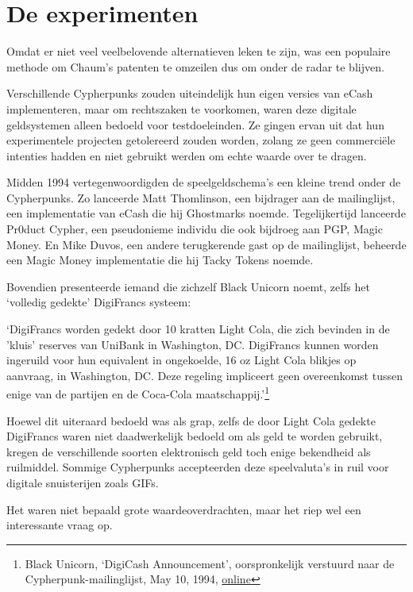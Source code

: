 \documentclass[smalldemyvopaper,11pt,twoside,onecolumn,openright,extrafontsizes,hidelinks]{memoir}
\begin{document}
\section{De experimenten}\label{de-experimenten}

Omdat er niet veel veelbelovende alternatieven leken te zijn, was een
populaire methode om Chaum's patenten te omzeilen dus om onder de radar
te blijven.

Verschillende Cypherpunks zouden uiteindelijk hun eigen versies van
eCash implementeren, maar om rechtszaken te voorkomen, waren deze
digitale geldsystemen alleen bedoeld voor testdoeleinden. Ze gingen
ervan uit dat hun experimentele projecten getolereerd zouden worden,
zolang ze geen commerciële intenties hadden en niet gebruikt werden om
echte waarde over te dragen.

Midden 1994 vertegenwoordigden de speelgeldschema's een kleine trend
onder de Cypherpunks. Zo lanceerde Matt Thomlinson, een bijdrager aan de
mailinglijst, een implementatie van eCash die hij Ghostmarks noemde.
Tegelijkertijd lanceerde Pr0duct Cypher, een pseudonieme individu die
ook bijdroeg aan PGP, Magic Money. En Mike Duvos, een andere
terugkerende gast op de mailinglijst, beheerde een Magic Money
implementatie die hij Tacky Tokens noemde.

Bovendien presenteerde iemand die zichzelf Black Unicorn noemt, zelfs
het `volledig gedekte' DigiFrancs systeem:

`DigiFrancs worden gedekt door 10 kratten Light Cola, die zich bevinden
in de 'kluis' reserves van UniBank in Washington, DC. DigiFrancs kunnen
worden ingeruild voor hun equivalent in ongekoelde, 16 oz Light Cola
blikjes op aanvraag, in Washington, DC. Deze regeling impliceert geen
overeenkomst tussen enige van de partijen en de Coca-Cola
maatschappij.'\footnote{Black Unicorn, `DigiCash Announcement',
  oorspronkelijk verstuurd naar de Cypherpunk-mailinglijst, May 10,
  1994,
  \href{https://cypherpunks.venona.com/date/1994/05/msg00616.html}{online}}

Hoewel dit uiteraard bedoeld was als grap, zelfs de door Light Cola
gedekte DigiFrancs waren niet daadwerkelijk bedoeld om als geld te
worden gebruikt, kregen de verschillende soorten elektronisch geld toch
enige bekendheid als ruilmiddel. Sommige Cypherpunks accepteerden deze
speelvaluta's in ruil voor digitale snuisterijen zoals GIFs.

Het waren niet bepaald grote waardeoverdrachten, maar het riep wel een
interessante vraag op.
\end{document}
